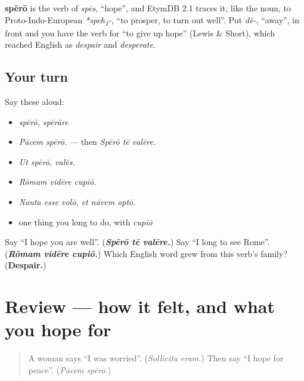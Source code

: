 \begin{cousinweb}
\textbf{spērō} is the verb of \emph{spēs}, \textquotedblleft{}hope\textquotedblright{}, and EtymDB 2.1 traces it, like the noun, to Proto-Indo-European \emph{*speh\textsubscript{1}-}, \textquotedblleft{}to prosper, to turn out well\textquotedblright{}. Put \emph{dē-}, \textquotedblleft{}away\textquotedblright{}, in front and you have the verb for \textquotedblleft{}to give up hope\textquotedblright{} (Lewis \& Short), which reached English as \emph{despair} and \emph{desperate}.
\end{cousinweb}

\subsection*{Your turn}
Say these aloud:

\begin{itemize}
\raggedright
  \item \emph{spērō, spērāre}
  \item \emph{Pācem spērō.} — then \emph{Spērō tē valēre.}
  \item \emph{Ut spērō, valēs.}
  \item \emph{Rōmam vidēre cupiō.}
  \item \emph{Nauta esse volō, et nāvem optō.}
  \item one thing you long to do, with \emph{cupiō}
\end{itemize}

\begin{tcolorbox}[breakable,colback=teal!4,colframe=teal!35!black,title={Before you move on}]
Say \textquotedblleft{}I hope you are well\textquotedblright{}. (\emph{\textbf{Spērō tē valēre.}}) Say \textquotedblleft{}I long to see Rome\textquotedblright{}. (\emph{\textbf{Rōmam vidēre cupiō.}}) Which English word grew from this verb's family? (\textbf{Despair.})
\end{tcolorbox}
\section[(review)]{Review — how it felt, and what you hope for}

\label{lesson:LA-R287-how-it-felt}



\begin{quote}
A woman says \textquotedblleft{}I was worried\textquotedblright{}. (\emph{Sollicita eram.}) Then say \textquotedblleft{}I hope for peace\textquotedblright{}. (\emph{Pācem spērō.})
\end{quote}

